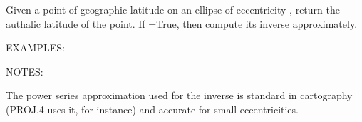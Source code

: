 \documentclass[a4paper,12ptopenany,oneside,english]{sphinxmanual}
\begin{document}
\begin{fulllineitems}
\label{\detokenize{utils:rhealpixdggs.utils.auth_lat}}
\pysigstartsignatures
{}
\pysigstopsignatures
\sphinxAtStartPar
Given a point of geographic latitude  on an ellipse of
eccentricity , return the authalic latitude of the point.
If  =True, then compute its inverse approximately.

\sphinxAtStartPar
EXAMPLES:

\begin{sphinxVerbatim}[commandchars=\\\{\}]
    
 
\end{sphinxVerbatim}
\begin{description}

\begin{sphinxVerbatim}[commandchars=\\\{\}]
    
\end{sphinxVerbatim}


\begin{sphinxVerbatim}[commandchars=\\\{\}]
 
\end{sphinxVerbatim}

\end{description}

\sphinxAtStartPar
NOTES:

\sphinxAtStartPar
The power series approximation used for the inverse is
standard in cartography (PROJ.4 uses it, for instance)
and accurate for small eccentricities.

\end{fulllineitems}
\end{document}
